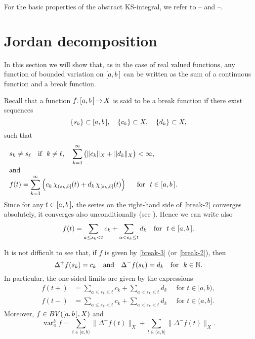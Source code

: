 \documentclass[12pt,twoside]{article}
\numberwithin{equation}{section}
\theoremstyle{plain}
\theoremstyle{definition}
\DeclareMathOperator{\var}{var}
\begin{document}
{For the basic properties of the abstract KS-integral, we refer to \cite{Sch1}--\cite{Sch3}
and \cite{MT1}--\cite{MT2}.


\section{Jordan decomposition}\label{sec3}
In this section we will show that, as in the case of real valued functions, any
function of bounded variation on $[a,b\,]$ can be written as the sum of a continuous function and a break
function.

Recall that a function $f{:}\,[a,b\,]\,{\to}\,X$ is said to be a break function if there exist sequences
\[
   \{s_k\}\subset[a,b\,],\quad \{c_k\}\subset X,\quad \{d_k\}\subset X,
\]
such that
\begin{align}\label{break-1}
   &s_k\ne s_\ell \quad\mbox{if \ } k\ne\ell,\quad
   \sum_{k=1}^\infty\big(\|c_k\|_X+\|d_k\|_X\big)<\infty,
  \\\ia\label{break-2}
   &f(t)=\dis\sum_{k=1}^\infty\Big(c_k\,\chi_{(s_k,b]}(t)+d_k\,\chi_{[s_k,b]}(t)\Big)
   \quad\mbox{ \ for \ }t\in\ab.
\end{align}
Since for any $t\in[a,b\,],$ the series on the right-hand side of \eqref{break-2} converges
absolutely, it converges also unconditionally (see \cite[Chapter VI]{Di}). Hence we can
write also
\begin{equation}\label{break-3}
  f(t)=\sum_{a\le s_k<t}c_k+\sum_{a<s_k\le t}d_k \quad\mbox{for \ }t\in\ab.
\end{equation}

\skipaline

It is not difficult to see that, if $f$ is given by \eqref{break-3} (or \eqref{break-2}),
then
\[
    \Delta^+f(s_k)=c_k\quad\mbox{and}\quad
    \Delta^-f(s_k)=d_k\quad\mbox{for \ }k\in{\mathbb N}.
\]
In particular, the one-sided limits are given by the expressions
\begin{align*}
   f(t+)&=\sum_{a\le s_k\le t}c_k+\sum_{a<s_k\le t}d_k \quad\mbox{ \ for \ }t\in[a,b),
  \\
   f(t-)&=\sum_{a\leq s_k<t}c_k+\sum_{a<s_k<t}d_k \quad\mbox{ \ for \ }t\in(a,b].
\end{align*}
Moreover, $f\in BV([a,b\,],X)$ and
\[
   \var_a^bf=\sum_{t\in[a,b)}\|\Delta^+f(t)\|_X+\sum_{t\in(a,b]}\|\Delta^-f(t)\|_X.
\]

\smallskip

}
\end{document}
